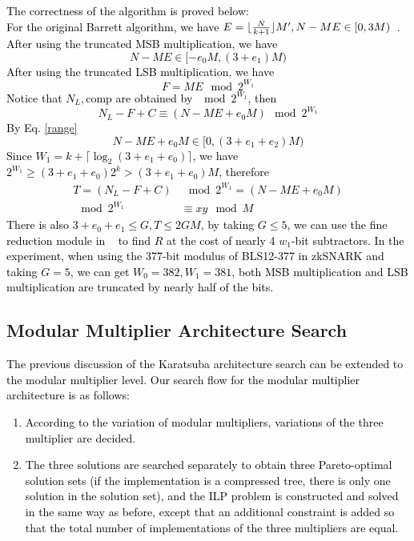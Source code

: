 \documentclass[conference]{IEEEtran}
\begin{document}
\textcolor{black}{
The correctness of the algorithm is proved below: \\
For the original Barrett algorithm, we have $E = \lfloor {N\over {k+1}} \rfloor M', N - ME \in [0, 3M)$~\cite{Efficient_FPGA_Modular_Multiplication_Implementation}. After using the truncated MSB multiplication, we have
\begin{equation}
    N - ME \in [-e_0M, (3+e_1)M)
    \label{range}
\end{equation}
After using the truncated LSB multiplication, we have
\begin{equation}
    F = ME \mod 2^{W_1}
\end{equation}
Notice that $N_L, \text{comp}$ are obtained by $\mod 2^{W_1}$, then
\begin{equation}
    N_L - F + C \equiv (N - ME +e_0M) \mod 2^{W_1}
\end{equation}
By Eq. \ref{range}
\begin{equation}
    N - ME +e_0M \in [0, (3+e_1+e_2)M)
\end{equation}
Since $W_1 = k + \lceil \log_2(3 + e_1 + e_0)\rceil$, we have $2^{W_1} \ge (3+e_1+e_0)2^{k} > (3+e_1+e_0)M$, therefore
\begin{equation}
    \begin{split}
    T =(N_L - F + C) &\mod 2^{W_1} = (N - ME +e_0M) \\
    \mod 2^{W_1} &\equiv xy \mod M
    \end{split} 
\end{equation}
There is also $3 + e_0 + e_1 \le G, T \le 2GM$, by taking $G \le 5$, we can use the fine reduction module in ~\cite{Efficient_FPGA_Modular_Multiplication_Implementation} to find $R$ at the cost of nearly 4 $w_1$-bit subtractors. In the experiment, when using the 377-bit modulus of BLS12-377 in zkSNARK and taking $G = 5$, we can get $W_0 = 382, W_1 = 381$, both MSB multiplication and LSB multiplication are truncated by nearly half of the bits.
}

\subsection{Modular Multiplier Architecture Search}

\textcolor{black}{
The previous discussion of the Karatsuba architecture search can be extended to the modular multiplier level. Our search flow for the modular multiplier architecture is as follows:
\begin{enumerate}[(1)]
    \item According to the variation of modular multipliers, variations of the three multiplier are decided.
    \item The three solutions are searched separately to obtain three Pareto-optimal solution sets (if the implementation is a compressed tree, there is only one solution in the solution set), and the ILP problem is constructed and solved in the same way as before, except that an additional constraint is added so that the total number of implementations of the three multipliers are equal.
\end{enumerate}
}
\end{document}

